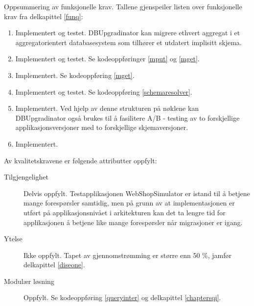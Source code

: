 Oppsummering av funksjonelle krav. Tallene gjenspeiler listen over funksjonelle krav fra delkapittel \ref{funq}:

\begin{enumerate}
  \item Implementert og testet. DBUpgradinator kan migrere ethvert aggregat i et aggregatorientert databasesystem som tilhører et utdatert implisitt skjema.
  \item Implementert og testet. Se kodeoppføringer \ref{mput} og \ref{mget}.
  \item Implementert. Se kodeoppføring \ref{mget}.
  \item Implementert og testet. Se kodeoppføring \ref{schemaresolver}.
  \item Implementert. Ved hjelp av denne strukturen på nøklene kan DBUpgradinator også brukes til å fasilitere A/B - testing av to forskjellige applikasjonsversjoner med to forskjellige skjemaversjoner.
  \item Implementert.
\end{enumerate}

Av kvalitetskravene er følgende attributter oppfylt:

\begin{description}
  \item[Tilgjengelighet] Delvis oppfylt. Testapplikasjonen WebShopSimulator er istand til å betjene mange forespørsler samtidig, men på grunn av at implementasjonen er utført på applikasjonsnivået i arkitekturen kan det ta lengre tid for applikasjonen å betjene like mange forespørsler når migrasjoner er igang.
  \item[Ytelse] Ikke oppfylt. Tapet av gjennomstrømming er større enn 50 \%, jamfør delkapittel \ref{diseone}.
  \item[Modulær løsning] Oppfylt. Se kodeoppføring \ref{queryinter} og delkapittel \ref{chaptersqi}.
\end{description}

